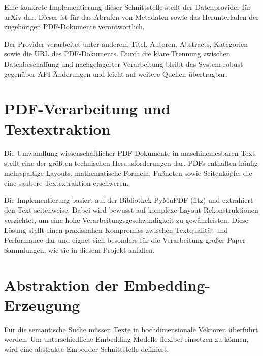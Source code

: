 Eine konkrete Implementierung dieser Schnittstelle stellt der Datenprovider für arXiv dar. Dieser ist für das Abrufen von Metadaten sowie das Herunterladen der zugehörigen PDF-Dokumente verantwortlich.



Der Provider verarbeitet unter anderem Titel, Autoren, Abstracts, Kategorien sowie die URL des PDF-Dokuments. Durch die klare Trennung zwischen Datenbeschaffung und nachgelagerter Verarbeitung bleibt das System robust gegenüber API-Änderungen und leicht auf weitere Quellen übertragbar.

\section{PDF-Verarbeitung und Textextraktion}

Die Umwandlung wissenschaftlicher PDF-Dokumente in maschinenlesbaren Text stellt eine der größten technischen Herausforderungen dar. PDFs enthalten häufig mehrspaltige Layouts, mathematische Formeln, Fußnoten sowie Seitenköpfe, die eine saubere Textextraktion erschweren.



Die Implementierung basiert auf der Bibliothek PyMuPDF (fitz) und extrahiert den Text seitenweise. Dabei wird bewusst auf komplexe Layout-Rekonstruktionen verzichtet, um eine hohe Verarbeitungsgeschwindigkeit zu gewährleisten. Diese Lösung stellt einen praxisnahen Kompromiss zwischen Textqualität und Performance dar und eignet sich besonders für die Verarbeitung großer Paper-Sammlungen, wie sie in diesem Projekt anfallen.

\section{Abstraktion der Embedding-Erzeugung}

Für die semantische Suche müssen Texte in hochdimensionale Vektoren überführt werden. Um unterschiedliche Embedding-Modelle flexibel einsetzen zu können, wird eine abstrakte Embedder-Schnittstelle definiert.



